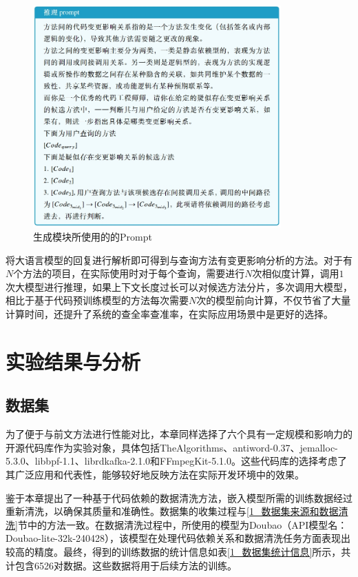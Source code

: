 \begin{figure}[htbp]
\centering
\includegraphics[width = 0.85\textwidth]{figures/2_推理prompt.png}
\caption{生成模块所使用的的Prompt}
\label{2_推理prompt}
\end{figure}


将大语言模型的回复进行解析即可得到与查询方法有变更影响分析的方法。对于有$N$个方法的项目，在实际使用时对于每个查询，需要进行$N$次相似度计算，调用$1$次大模型进行推理，如果上下文长度过长可以对候选方法分片，多次调用大模型，相比于基于代码预训练模型的方法每次需要$N$次的模型前向计算，不仅节省了大量计算时间，还提升了系统的查全率查准率，在实际应用场景中是更好的选择。


\section{实验结果与分析}

\subsection{数据集}
为了便于与前文方法进行性能对比，本章同样选择了六个具有一定规模和影响力的开源代码库作为实验对象，具体包括TheAlgorithms、antiword-0.37、jemalloc-5.3.0、libbpf-1.1、librdkafka-2.1.0和FFmpegKit-5.1.0。这些代码库的选择考虑了其广泛应用和代表性，能够较好地反映方法在实际开发环境中的效果。

鉴于本章提出了一种基于代码依赖的数据清洗方法，嵌入模型所需的训练数据经过重新清洗，以确保其质量和准确性。数据集的收集过程与\ref{1_数据集来源和数据清洗}节中的方法一致。在数据清洗过程中，所使用的模型为Doubao（API模型名：Doubao-lite-32k-240428），该模型在处理代码依赖关系和数据清洗任务方面表现出较高的精度。最终，得到的训练数据的统计信息如表\ref{1_数据集统计信息}所示，共计包含6526对数据。这些数据将用于后续方法的训练。


